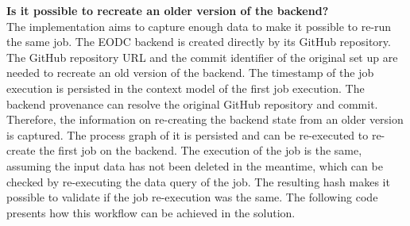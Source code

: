 \documentclass[draft,final]{vutinfth} %
\begin{document}
\textbf{Is it possible to recreate an older version of the backend?} \\
The implementation aims to capture enough data to make it possible to re-run the same job. The EODC backend is created directly by its GitHub repository. The GitHub repository URL and the commit identifier of the original set up are needed to recreate an old version of the backend. The timestamp of the job execution is persisted in the context model of the first job execution. The backend provenance can resolve the original GitHub repository and commit. Therefore, the information on re-creating the backend state from an older version is captured. The process graph of it is persisted and can be re-executed to re-create the first job on the backend. The execution of the job is the same, assuming the input data has not been deleted in the meantime, which can be checked by re-executing the data query of the job. The resulting hash makes it possible to validate if the job re-execution was the same. The following code presents how this workflow can be achieved in the solution.
\end{document}
